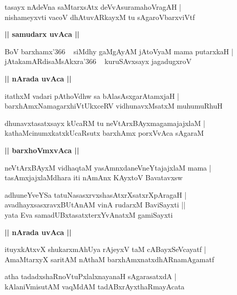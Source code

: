 \documentclass[twoside,12pt,openright]{book}
\newcounter{shloka}[chapter]
\def\uvaca#1{\centerline{{\large\textbf{#1}}}}
\begin{document}
\begin{shloka}%
tasayx nAdeVna saMtarxsAtx deVvAsuramahoVragAH |\\
nishameyxvti vacoV dhAtuvARkayxM tu sAgaroVbarxviVtf 
\end{shloka}

\uvaca{|| samudarx uvAca ||}

\begin{shloka}%
BoV barxhamx\char'366 ~ siMdhy gaMgAyAM jAtoVyaM mama putarxkaH |\\
jAtakamARdisaMsAkxra\char'366 ~ kuruSAvxsayx jagadugxroV 
\end{shloka}

\uvaca{|| nArada uvAca ||}

\begin{shloka}%
itathxM vadari pAthoVdhw sa bAlasAsxgarAtamxjaH |\\
barxhAmxNamagarxhiVtUkxceRV vidhunavxMsatxM muhumuRhuH 
\end{shloka}

\begin{shloka}%
dhunavxtasatxsayx kUcaRM tu neVtArxBAyxmagamajajxlaM |\\
kathaMcinumxkatxkUcaRsutx barxhAmx porxVvAca sAgaraM 
\end{shloka}

\uvaca{|| barxhoVmxvAca ||}

\begin{shloka}%
neVtArxBAyxM vidhaqtaM yasAmnxdaneVneYtajajxlaM mama |\\
tasAmxjajxlaMdhara iti nAmAnx KAyxtoV Bavatavxsw 
\end{shloka}

\begin{shloka}%
adhuneYveYSa tatuNasasxrvxshasAtxrXsatxrXpAragaH |\\
avadhayxsasxravxBUtAnAM vinA rudarxM BaviSayxti ||\\
yata Eva samadUBxtasatxterxYvAnatxM gamiSayxti 
\end{shloka}

\uvaca{|| nArada uvAca ||}

\begin{shloka}%
ituyxkAtxvX shukarxmAhUya rAjeyxV taM cABayxSeVcayatf |\\
AmaMtarxyX saritAM nAthaM barxhAmxnatxdhARnamAgamatf 
\end{shloka}

\begin{shloka}%
atha tadadxshaRnoVtuPxlalxnayanaH sAgarasatxdA |\\
kAlaniVmisutAM vaqMdAM tadABxrAyxthaRmayAcata
\end{shloka}
\end{document}
